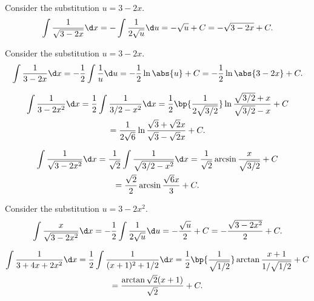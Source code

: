 \begin{solution}
    \begin{ppart}
        Consider the substitution $u = 3-2x$.
        \begin{align*}
            \int \frac1{\sqrt{3-2x}} \d x = -\int \frac1{2\sqrt u} \d u  = -\sqrt{u} + C = -\sqrt{3-2x} + C.
        \end{align*}
    \end{ppart}
    \begin{ppart}
        Consider the substitution $u = 3-2x$. \[\int \frac1{3-2x} \d x = -\frac12 \int \frac1{u} \d u = -\frac12 \ln \abs{u} + C = -\frac12 \ln \abs{3 - 2x} + C.\]
    \end{ppart}
    \begin{ppart}
        \begin{gather*}
            \int \frac1{3-2x^2} \d x = \frac12 \int \frac1{3/2 - x^2} \d x = \frac12 \bp{\frac1{2\sqrt{3/2}}} \ln{\frac{\sqrt{3/2} + x}{\sqrt{3/2} - x}} + C \\
            = \frac1{2\sqrt6} \ln{\frac{\sqrt3 + \sqrt2 x}{\sqrt3 - \sqrt2 x}} + C.
        \end{gather*}
    \end{ppart}
    \begin{ppart}
        \begin{gather*}
            \int \frac1{\sqrt{3-2x^2}} \d x = \frac1{\sqrt2} \int \frac1{\sqrt{3/2 - x^2}} \d x = \frac1{\sqrt2} \arcsin{\frac{x}{\sqrt{3/2}}} + C \\
            = \frac{\sqrt2}2 \arcsin{\frac{\sqrt6 x}{3}} + C.
        \end{gather*}
    \end{ppart}
    \begin{ppart}
        Consider the substitution $u = 3-2x^2$.
        \begin{align*}
            \int \frac{x}{\sqrt{3-2x^2}} \d x = -\frac12 \int \frac1{2\sqrt {u}} \d u = -\frac{\sqrt{u}}2 + C = -\frac{\sqrt{3 - 2x^2}}2 + C.
        \end{align*}
    \end{ppart}
    \begin{ppart}
        \begin{gather*}
            \int \frac1{3+4x+2x^2} \d x = \frac12 \int \frac1{(x+1)^2 + 1/2} \d x = \frac12 \bp{\frac1{\sqrt{1/2}}} \arctan{\frac{x+1}{1/\sqrt{1/2}}} + C \\
            = \frac{\arctan{\sqrt2 (x + 1)}}{\sqrt2}  + C.
        \end{gather*}
    \end{ppart}
\end{solution}


